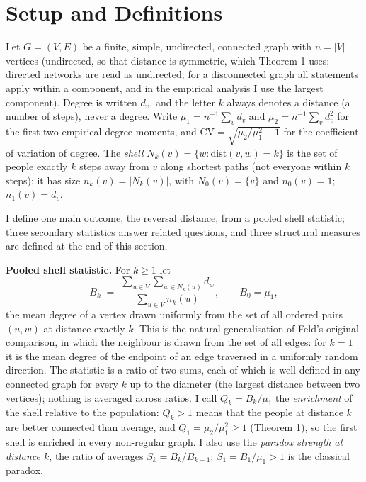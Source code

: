 \documentclass{nws}
\begin{document}
\section{Setup and Definitions}

Let $G=(V,E)$ be a finite, simple, undirected, connected graph with $n=|V|$ vertices
(undirected, so that distance is symmetric, which Theorem 1 uses; directed networks are read as undirected; for a disconnected graph all statements apply within a component, and in the
empirical analysis I use the largest component). Degree is written $d_v$, and the letter $k$ always denotes a distance (a number of steps), never a degree. Write $\mu_1=n^{-1}\sum_v d_v$ and
$\mu_2=n^{-1}\sum_v d_v^2$ for the first two empirical degree moments, and
$\mathrm{CV}=\sqrt{\mu_2/\mu_1^2-1}$ for the coefficient of variation of
degree. The \emph{shell} $N_k(v)=\{w:\mathrm{dist}(v,w)=k\}$ is the set of people exactly $k$ steps away from $v$ along shortest paths (not everyone within $k$ steps); it has size
$n_k(v)=|N_k(v)|$, with $N_0(v)=\{v\}$ and $n_0(v)=1$; $n_1(v)=d_v$.

I define one main outcome, the reversal distance, from a pooled shell statistic; three secondary statistics answer related questions, and three structural measures are defined at the end of this section.

\textbf{Pooled shell statistic.} For $k\ge 1$ let
\begin{equation*}
B_k \;=\; \frac{\sum_{u\in V}\sum_{w\in N_k(u)} d_w}{\sum_{u\in V} n_k(u)},
\qquad B_0=\mu_1 ,
\end{equation*}
the mean degree of a vertex drawn uniformly from the set of all ordered pairs
$(u,w)$ at distance exactly $k$. This is the natural generalisation of Feld's
original comparison, in which the neighbour is drawn from the set of all edges:
for $k=1$ it is the mean degree of the endpoint of an edge traversed in a
uniformly random direction. The statistic is a ratio of two sums, each of which is well defined in any
connected graph for every $k$ up to the diameter (the largest distance between two vertices); nothing is averaged
across ratios. I call $Q_k=B_k/\mu_1$ the \emph{enrichment} of the shell relative to the
population: $Q_k>1$ means that the people at distance $k$ are better connected than
average, and $Q_1=\mu_2/\mu_1^2\ge1$ (Theorem 1), so the first shell is enriched in every
non-regular graph. I also use the \emph{paradox strength at distance $k$}, the ratio of averages
$S_k=B_k/B_{k-1}$; $S_1=B_1/\mu_1>1$ is the classical paradox.
\end{document}
